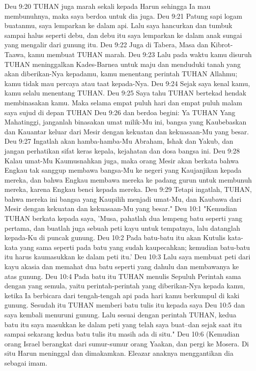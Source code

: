 Deu 9:20  TUHAN juga marah sekali kepada Harun sehingga Ia mau membunuhnya, maka saya berdoa untuk dia juga.
Deu 9:21  Patung sapi logam buatanmu, saya lemparkan ke dalam api. Lalu saya hancurkan dan tumbuk sampai halus seperti debu, dan debu itu saya lemparkan ke dalam anak sungai yang mengalir dari gunung itu.
Deu 9:22  Juga di Tabera, Masa dan Kibrot-Taawa, kamu membuat TUHAN marah.
Deu 9:23  Lalu pada waktu kamu disuruh TUHAN meninggalkan Kades-Barnea untuk maju dan menduduki tanah yang akan diberikan-Nya kepadamu, kamu menentang perintah TUHAN Allahmu; kamu tidak mau percaya atau taat kepada-Nya.
Deu 9:24  Sejak saya kenal kamu, kamu selalu menentang TUHAN.
Deu 9:25  Saya tahu TUHAN bertekad hendak membinasakan kamu. Maka selama empat puluh hari dan empat puluh malam saya sujud di depan TUHAN
Deu 9:26  dan berdoa begini: Ya TUHAN Yang Mahatinggi, janganlah binasakan umat milik-Mu ini, bangsa yang Kaubebaskan dan Kauantar keluar dari Mesir dengan kekuatan dan kekuasaan-Mu yang besar.
Deu 9:27  Ingatlah akan hamba-hamba-Mu Abraham, Ishak dan Yakub, dan jangan perhatikan sifat keras kepala, kejahatan dan dosa bangsa ini.
Deu 9:28  Kalau umat-Mu Kaumusnahkan juga, maka orang Mesir akan berkata bahwa Engkau tak sanggup membawa bangsa-Mu ke negeri yang Kaujanjikan kepada mereka, dan bahwa Engkau membawa mereka ke padang gurun untuk membunuh mereka, karena Engkau benci kepada mereka.
Deu 9:29  Tetapi ingatlah, TUHAN, bahwa mereka ini bangsa yang Kaupilih menjadi umat-Mu, dan Kaubawa dari Mesir dengan kekuatan dan kekuasaan-Mu yang besar."
Deu 10:1  "Kemudian TUHAN berkata kepada saya, 'Musa, pahatlah dua lempeng batu seperti yang pertama, dan buatlah juga sebuah peti kayu untuk tempatnya, lalu datanglah kepada-Ku di puncak gunung.
Deu 10:2  Pada batu-batu itu akan Kutulis kata-kata yang sama seperti pada batu yang sudah kaupecahkan; kemudian batu-batu itu harus kaumasukkan ke dalam peti itu.'
Deu 10:3  Lalu saya membuat peti dari kayu akasia dan memahat dua batu seperti yang dahulu dan membawanya ke atas gunung.
Deu 10:4  Pada batu itu TUHAN menulis Sepuluh Perintah sama dengan yang semula, yaitu perintah-perintah yang diberikan-Nya kepada kamu, ketika Ia berbicara dari tengah-tengah api pada hari kamu berkumpul di kaki gunung. Sesudah itu TUHAN memberi batu tulis itu kepada saya
Deu 10:5  dan saya kembali menuruni gunung. Lalu sesuai dengan perintah TUHAN, kedua batu itu saya masukkan ke dalam peti yang telah saya buat--dan sejak saat itu sampai sekarang kedua batu tulis itu masih ada di situ."
Deu 10:6  (Kemudian orang Israel berangkat dari sumur-sumur orang Yaakan, dan pergi ke Mosera. Di situ Harun meninggal dan dimakamkan. Eleazar anaknya menggantikan dia sebagai imam.
